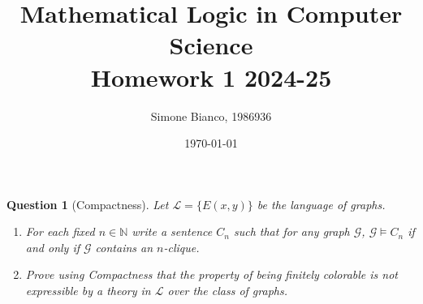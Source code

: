 \documentclass[12pt,a4paper]{report}
\newtheorem{question}{Question}
\theoremstyle{definition}
\newcommand{\N}{\mathbb{N}}                     %
\begin{document}
    \setlength{\parskip}{5pt}               %
    \setlength{\parindent}{0pt}             %

    \title{Mathematical Logic in Computer Science \\ Homework 1 2024-25}
    \author{Simone Bianco, 1986936}
    \date{\today}

    \maketitle

    \begin{question}[Compactness]
        Let $\mathcal{L} = \{E(x, y)\}$ be the language of graphs.
        \begin{enumerate}
            \item For each fixed $n \in \N$ write a sentence $C_n$ such that for any graph $\mathcal{G}$, $\mathcal{G} \models C_n$ if and only if $\mathcal{G}$ contains an $n$-clique.
            \item Prove using Compactness that the property of being finitely colorable is not expressible by a theory in $\mathcal{L}$ over the class of graphs.
        \end{enumerate}
    \end{question}
\end{document}
